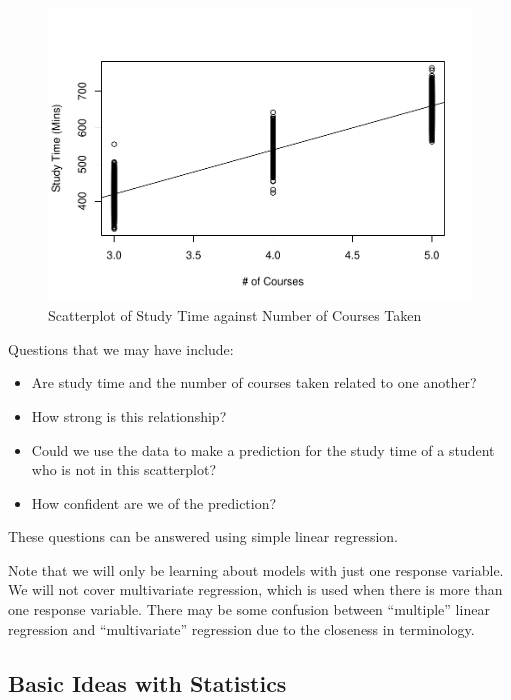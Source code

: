 \documentclass[
]{book}
\providecommand{\tightlist}{%
  \setlength{\itemsep}{0pt}\setlength{\parskip}{0pt}}
\begin{document}
\begin{figure}
\centering
\includegraphics{bookdown-demo_files/figure-latex/scatter-courses-1.pdf}
\caption{\label{fig:scatter-courses}Scatterplot of Study Time against Number of Courses Taken}
\end{figure}

Questions that we may have include:

\begin{itemize}
\tightlist
\item
  Are study time and the number of courses taken related to one another?
\item
  How strong is this relationship?
\item
  Could we use the data to make a prediction for the study time of a student who is not in this scatterplot?
\item
  How confident are we of the prediction?
\end{itemize}

These questions can be answered using simple linear regression.

Note that we will only be learning about models with just one response variable. We will not cover multivariate regression, which is used when there is more than one response variable. There may be some confusion between ``multiple'' linear regression and ``multivariate'' regression due to the closeness in terminology.

\hypertarget{basic-ideas-with-statistics}{%
\subsection{Basic Ideas with Statistics}\label{basic-ideas-with-statistics}}
\end{document}

